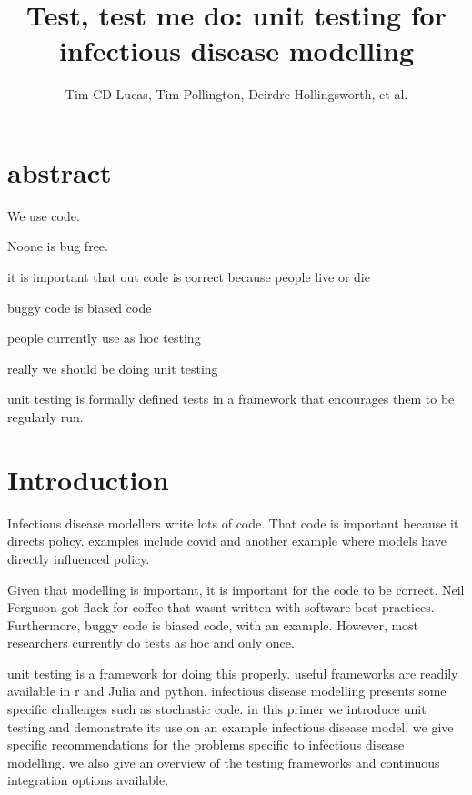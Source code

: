 \documentclass{article}
\title{Test, test me do: unit testing for infectious disease modelling}
\author{Tim CD Lucas, Tim Pollington, Deirdre Hollingsworth, et al.}
\begin{document}







\maketitle

\section{abstract}

We use code.

Noone is bug free.

it is important that out code is correct because people live or die

buggy code is biased code

people currently use as hoc testing

really we should be doing unit testing

unit testing is formally defined tests in a framework that encourages them to be regularly run.

\section{Introduction}

Infectious disease modellers write lots of code.
That code is important because it directs policy.
examples include covid and another example where models have directly influenced policy.

Given that modelling is important, it is important for the code to be correct.
Neil Ferguson got flack for coffee that wasnt written with software best practices.
Furthermore, buggy code is biased code, with an example.
However, most researchers currently do tests as hoc and only once.

unit testing is a framework for doing this properly.
useful frameworks are readily available in r and Julia and python.
infectious disease modelling presents some specific challenges such as stochastic code.
in this primer we introduce unit testing and demonstrate its use on an example infectious disease model.
we give specific recommendations for the problems specific to infectious disease modelling.
we also give an overview of the testing frameworks and continuous integration options available.
\end{document}
